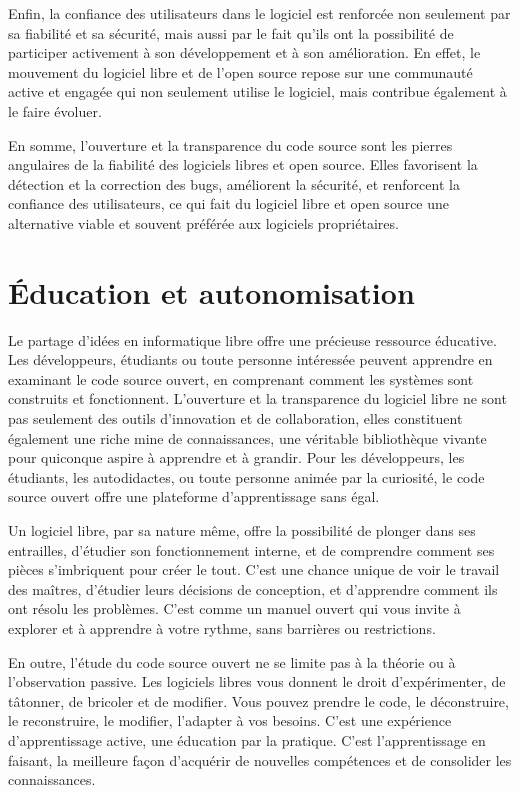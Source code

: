 Enfin, la confiance des utilisateurs dans le logiciel est renforcée non seulement par sa fiabilité et sa sécurité, mais aussi par le fait qu'ils ont la possibilité de participer activement à son développement et à son amélioration. En effet, le mouvement du logiciel libre et de l'open source repose sur une communauté active et engagée qui non seulement utilise le logiciel, mais contribue également à le faire évoluer.

En somme, l'ouverture et la transparence du code source sont les pierres angulaires de la fiabilité des logiciels libres et open source. Elles favorisent la détection et la correction des bugs, améliorent la sécurité, et renforcent la confiance des utilisateurs, ce qui fait du logiciel libre et open source une alternative viable et souvent préférée aux logiciels propriétaires.

\section{Éducation et autonomisation}
Le partage d'idées en informatique libre offre une précieuse ressource éducative. Les développeurs, étudiants ou toute personne intéressée peuvent apprendre en examinant le code source ouvert, en comprenant comment les systèmes sont construits et fonctionnent.
L'ouverture et la transparence du logiciel libre ne sont pas seulement des outils d'innovation et de collaboration, elles constituent également une riche mine de connaissances, une véritable bibliothèque vivante pour quiconque aspire à apprendre et à grandir. Pour les développeurs, les étudiants, les autodidactes, ou toute personne animée par la curiosité, le code source ouvert offre une plateforme d'apprentissage sans égal.

Un logiciel libre, par sa nature même, offre la possibilité de plonger dans ses entrailles, d'étudier son fonctionnement interne, et de comprendre comment ses pièces s'imbriquent pour créer le tout. C'est une chance unique de voir le travail des maîtres, d'étudier leurs décisions de conception, et d'apprendre comment ils ont résolu les problèmes. C'est comme un manuel ouvert qui vous invite à explorer et à apprendre à votre rythme, sans barrières ou restrictions.

En outre, l'étude du code source ouvert ne se limite pas à la théorie ou à l'observation passive. Les logiciels libres vous donnent le droit d'expérimenter, de tâtonner, de bricoler et de modifier. Vous pouvez prendre le code, le déconstruire, le reconstruire, le modifier, l'adapter à vos besoins. C'est une expérience d'apprentissage active, une éducation par la pratique. C'est l'apprentissage en faisant, la meilleure façon d'acquérir de nouvelles compétences et de consolider les connaissances.


